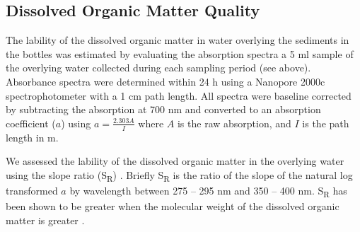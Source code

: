 \subsection{Dissolved Organic Matter Quality}

The lability of the dissolved organic matter in water overlying the sediments in the bottles was estimated by evaluating the absorption spectra a 5 ml sample of the overlying water collected during each sampling period (see above). Absorbance spectra were determined within 24 h using a Nanopore 2000c spectrophotometer with a 1 cm path length. All spectra were baseline corrected by subtracting the absorption at 700 nm and converted to an absorption coefficient ($a$) using $a = \frac{2.303A}{I}$ where $A$ is the raw absorption, and $I$ is the path length in m.

We assessed the lability of the dissolved organic matter in the overlying water using the slope ratio (S\textsubscript{R}) \cite{helmsetal2008}. Briefly S\textsubscript{R} is the ratio of the slope of the natural log transformed $a$ by wavelength between 275 -- 295 nm and 350 -- 400 nm. S\textsubscript{R} has been shown to be greater when the molecular weight of the dissolved organic matter is greater \cite{helmsetal2008}. 

  
  